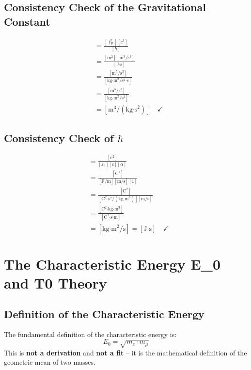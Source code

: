 	\subsection{Consistency Check of the Gravitational Constant}
	
	\begin{align}
		[G] &= \frac{[\ell_P^2][c^3]}{[\hbar]}\\
		&= \frac{[\text{m}^2][\text{m}^3/\text{s}^3]}{[\text{J·s}]}\\
		&= \frac{[\text{m}^5/\text{s}^3]}{[\text{kg·m}^2/\text{s}^2\text{·s}]}\\
		&= \frac{[\text{m}^5/\text{s}^3]}{[\text{kg·m}^2/\text{s}^3]}\\
		&= [\text{m}^3/(\text{kg·s}^2)] \quad \checkmark
	\end{align}
	
	\subsection{Consistency Check of $\hbar$}
	
	\begin{align}
		[\hbar] &= \frac{[e^2]}{[\varepsilon_0][c][\alpha]}\\
		&= \frac{[\text{C}^2]}{[\text{F/m}][\text{m/s}][1]}\\
		&= \frac{[\text{C}^2]}{[\text{C}^2\text{·s}^2/(\text{kg·m}^3)][\text{m/s}]}\\
		&= \frac{[\text{C}^2\text{·kg·m}^3]}{[\text{C}^2\text{·s·m}]}\\
		&= [\text{kg·m}^2/\text{s}] = [\text{J·s}] \quad \checkmark
	\end{align}
	
	\section{The Characteristic Energy E\_0 and T0 Theory}
	
	\subsection{Definition of the Characteristic Energy}
	
	\begin{tcolorbox}[colback=blue!5!white,colframe=blue!75!black,title=Basic Definition]
		The fundamental definition of the characteristic energy is:
		\begin{equation}
			\boxed{E_0 = \sqrt{m_e \cdot m_\mu}}
		\end{equation}
		This is \textbf{not a derivation} and \textbf{not a fit} -- it is the mathematical definition of the geometric mean of two masses.
	\end{tcolorbox}
	
